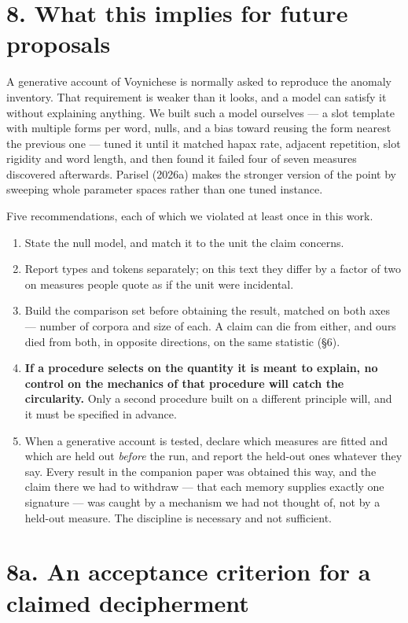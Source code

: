 \documentclass[11pt,a4paper]{article}
\begin{document}
\section*{8. What this implies for future proposals}


A generative account of Voynichese is normally asked to reproduce the anomaly inventory. That requirement is weaker than it looks, and a model can satisfy it without explaining anything. We built such a model ourselves --- a slot template with multiple forms per word, nulls, and a bias toward reusing the form nearest the previous one --- tuned it until it matched hapax rate, adjacent repetition, slot rigidity and word length, and then found it failed four of seven measures discovered afterwards. Parisel (2026a) makes the stronger version of the point by sweeping whole parameter spaces rather than one tuned instance.


Five recommendations, each of which we violated at least once in this work.


\begin{enumerate}\setlength\itemsep{0pt}
\item State the null model, and match it to the unit the claim concerns.
\item Report types and tokens separately; on this text they differ by a factor of two on measures people quote as if the unit were incidental.
\item Build the comparison set before obtaining the result, matched on both axes --- number of corpora and size of each. A claim can die from either, and ours died from both, in opposite directions, on the same statistic (\S6).
\item \textbf{If a procedure selects on the quantity it is meant to explain, no control on the mechanics of that procedure will catch the circularity.} Only a second procedure built on a different principle will, and it must be specified in advance.
\item When a generative account is tested, declare which measures are fitted and which are held out \emph{before} the run, and report the held-out ones whatever they say. Every result in the companion paper was obtained this way, and the claim there we had to withdraw --- that each memory supplies exactly one signature --- was caught by a mechanism we had not thought of, not by a held-out measure. The discipline is necessary and not sufficient.
\end{enumerate}

\section*{8a. An acceptance criterion for a claimed decipherment}
\end{document}
